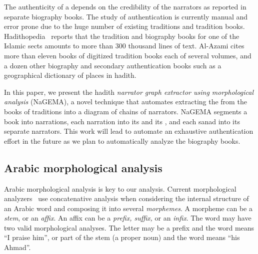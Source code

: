 \documentclass[11pt]{article}
\newcommand{\noArRL}[1]{\arabfalse\RL{#1}\arabtrue}
\begin{document}
The authenticity of a \noArRL{.hady_t} depends on 
the credibility of the narrators as reported in 
separate biography books. 
The study of \noArRL{.hady_t} authentication is 
currently manual and error prone due to the huge number
of existing traditions and tradition books. 
Hadithopedia~\cite{Hadithopaedia:08}
reports that the tradition and biography
books for one of the Islamic sects amounts to more than 
300 thousand lines of text. 
Al-Azami cites more than eleven books
of digitized tradition books each of several volumes, and a dozen
other biography and secondary authentication books such
as a geographical dictionary of places in hadith. 

\novocalize

\transfalse
\begin{figure}[tb]
\end{figure}
\transtrue
\vocalize

In this paper, we present the hadith {\em narrator graph
extractor using morphological analysis} (NaGEMA), 
a novel technique that automates
extracting the \noArRL{sanad} from the books of traditions 
into a diagram of chains of narrators. NaGEMA segments
a book into narrations, each narration into its \noArRL{matn} 
and its \noArRL{sanad}, 
and each sanad into its separate narrators. 
This work will lead to 
automate an exhaustive \noArRL{.hady_t} authentication 
effort in the future as we plan to 
automatically analyze the biography books.


\subsection{ Arabic morphological analysis}
Arabic morphological analysis is key to our analysis. 
Current morphological analyzers~\cite{Sughaiyer:04}
use concatenative analysis when
considering the internal structure 
of an Arabic word and
composing it into several {\em morphemes}. 
A morpheme can be a {\em stem}, or an {\em affix}.
An affix can be a {\em prefix, suffix, } or an {\em infix}.
\vocalize
The word 
may have two valid morphological analyses. 
The letter  may be a prefix and the word means 
``I praise him'', or 
part of the stem  (a proper noun)
and the word means ``his Ahmad''.
\end{document}
